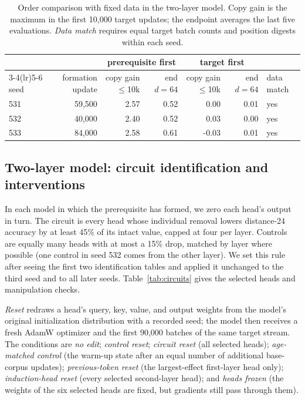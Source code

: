 \begin{table}[!htbp]
\centering\small
\caption{Order comparison with fixed data in the two-layer model. Copy gain is the
maximum in the first 10,000 target updates; the endpoint averages the last five
evaluations. \emph{Data match} requires equal target batch counts and position
digests within each seed.}
\label{tab:g1core}
\begin{tabular}{lrrrrrl}\toprule
 & & \multicolumn{2}{c}{prerequisite first} & \multicolumn{2}{c}{target first} & \\
\cmidrule(lr){3-4}\cmidrule(lr){5-6}
seed & formation update & copy gain $\le$10k & end $d{=}64$ & copy gain $\le$10k & end $d{=}64$ & data match\\\midrule
531 & 59,500 & 2.57 & 0.52 & 0.00 & 0.01 & yes \\
532 & 40,000 & 2.40 & 0.52 & 0.03 & 0.00 & yes \\
533 & 84,000 & 2.58 & 0.61 & -0.03 & 0.01 & yes \\
\bottomrule\end{tabular}
\end{table}

\subsection{Two-layer model: circuit identification and interventions}
\label{app:interventions}
In each model in which the prerequisite has formed, we zero each head's output in
turn. The circuit is every head whose individual removal lowers distance-24
accuracy by at least 45\% of its intact value, capped at four per layer. Controls are equally many
heads with at most a 15\% drop, matched by layer where possible (one control in
seed 532 comes from the other layer). We set this rule after seeing the first
two identification tables and applied it unchanged to the third seed and to all
later seeds. Table~\ref{tab:circuits} gives the selected heads and manipulation
checks.

\emph{Reset} redraws a head's query, key, value, and output weights from the
model's original initialization distribution with a recorded seed; the model then
receives a fresh AdamW optimizer and the first 90,000 batches of the same target
stream. The conditions are \emph{no edit}; \emph{control reset}; \emph{circuit
reset} (all selected heads); \emph{age-matched control} (the warm-up state after an
equal number of additional base-corpus updates); \emph{previous-token reset} (the
largest-effect first-layer head only); \emph{induction-head reset} (every selected
second-layer head); and \emph{heads frozen} (the weights of the six selected heads
are fixed, but gradients still pass through them).

